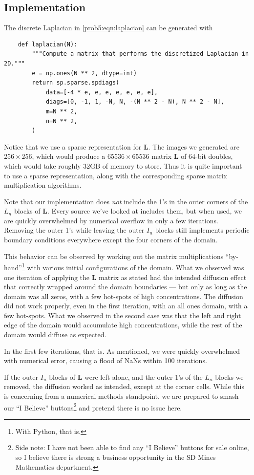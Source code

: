 \subsection{Implementation}
The discrete Laplacian in \autoref{prob5:eqn:laplacian} can be generated with
\begin{verbatim}
    def laplacian(N):
        """Compute a matrix that performs the discretized Laplacian in 2D."""
        e = np.ones(N ** 2, dtype=int)
        return sp.sparse.spdiags(
            data=[-4 * e, e, e, e, e, e, e],
            diags=[0, -1, 1, -N, N, -(N ** 2 - N), N ** 2 - N],
            m=N ** 2,
            n=N ** 2,
        )
\end{verbatim}
Notice that we use a sparse representation for $\mathbf L$.
The images we generated are $256 \times 256$, which would produce a $65536 \times 65536$ matrix $\mathbf L$ of 64-bit doubles, which would take roughly 32GB of memory to store.
Thus it is quite important to use a sparse representation, along with the corresponding sparse matrix multiplication algorithms.

Note that our implementation does \textit{not} include the 1's in the outer corners of the $L_n$ blocks of $\mathbf L$.
Every source we've looked at includes them, but when used, we are quickly overwhelmed by numerical overflow in only a few iterations.
Removing the outer 1's while leaving the outer $I_n$ blocks still implements periodic boundary conditions everywhere except the four corners of the domain.

This behavior can be observed by working out the matrix multiplications ``by-hand''\footnote{With Python, that is.} with various initial configurations of the domain.
What we observed was one iteration of applying the $\mathbf L$ matrix as stated had the intended diffusion effect that correctly wrapped around the domain boundaries --- but only as long as the domain was all zeros, with a few hot-spots of high concentrations.
The diffusion did not work properly, even in the first iteration, with an all ones domain, with a few hot-spots.
What we observed in the second case was that the left and right edge of the domain would accumulate high concentrations, while the rest of the domain would diffuse as expected.

In the first few iterations, that is.
As mentioned, we were quickly overwhelmed with numerical error, causing a flood of NaNs within 100 iterations.

If the outer $I_n$ blocks of $\mathbf L$ were left alone, and the outer 1's of the $L_n$ blocks we removed, the diffusion worked as intended, except at the corner cells.
While this is concerning from a numerical methods standpoint, we are prepared to smash our ``I Believe'' buttons\footnote{Side note: I have not been able to find any ``I Believe'' buttons for sale online, so I believe\texttrademark{} there is strong a business opportunity in the SD Mines Mathematics department.} and pretend there is no issue here.

